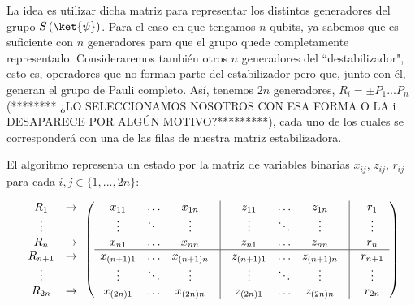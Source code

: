 \documentclass[11pt,a4paper,twoside,pdf]{article}
\numberwithin{equation}{section}
\begin{document}
	La idea es utilizar dicha matriz para representar los distintos generadores del grupo $S\left( \ket{\psi}\right)$. Para el caso en que tengamos $n$ qubits, ya sabemos que es suficiente con $n$ generadores para que el grupo quede completamente representado. Consideraremos también otros $n$ generadores del ``destabilizador", esto es, operadores que no forman parte del estabilizador pero que, junto con él, generan el grupo de Pauli completo. Así, tenemos $2n$ generadores, $R_i=\pm P_1...P_n$ (******** ¿LO SELECCIONAMOS NOSOTROS CON ESA FORMA O LA i DESAPARECE POR ALGÚN MOTIVO?*********), cada uno de los cuales se corresponderá con una de las filas de nuestra matriz estabilizadora.
	
	El algoritmo representa un estado por la matriz de variables binarias $x_{ij}$, $z_{ij}$, $r_{ij}$ para cada $i,j \in \{1,...,2n\}$:
	
		\begin{equation} \label{eq: matriz estabilizadora}
			\begin{array}{cc}
				R_1 &\rightarrow \\ \vdots \\ R_n &\rightarrow \\ R_{n+1} &\rightarrow \\ \vdots \\ R_{2n} &\rightarrow 
			\end{array}
			\left(\begin{array}{cccccccccc}
				x_{11}  	 & \hdots & x_{1n} 	    	& \vline & z_{11}       & \hdots & z_{1n}  		 & \vline & r_{1}       \\
				\vdots 	 	& \ddots & \vdots 	      & \vline & \vdots 	 & \ddots & \vdots 		 & \vline & \vdots	  \\
				x_{n1}  	 & \hdots & x_{nn}    	   & \vline & z_{n1}  	   & \hdots & z_{nn}	   & \vline & r_{n}		  \\ \hline
				x_{(n+1)1} & \hdots & x_{(n+1)n}   & \vline & z_{(n+1)1} & \hdots & z_{(n+1)n} & \vline & r_{n+1}    \\
				\vdots 		& \ddots  & \vdots 		  & \vline & \vdots 	 & \ddots & \vdots 	 	 & \vline & \vdots	   \\
				x_{(2n)1}  & \hdots  & x_{(2n)n}    & \vline & z_{(2n)1}  & \hdots & z_{(2n)n} 	 & \vline & r_{2n}		\\ 
			\end{array}\right)		
		\end{equation}
	
\end{document}
